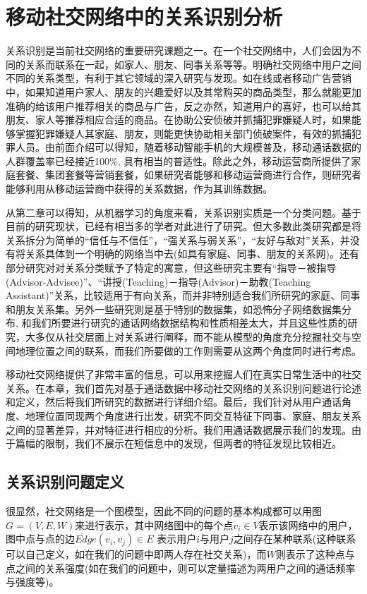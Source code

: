 \chapter{移动社交网络中的关系识别分析}

关系识别是当前社交网络的重要研究课题之一。在一个社交网络中，人们会因为不同的关系而联系在一起，如家人、朋友、同事关系等等。明确社交网络中用户之间不同的关系类型，有利于其它领域的深入研究与发现。如在线或者移动广告营销中，如果知道用户家人、朋友的兴趣爱好以及其常购买的商品类型，那么就能更加准确的给该用户推荐相关的商品与广告，反之亦然，知道用户的喜好，也可以给其朋友、家人等推荐相应合适的商品。在协助公安侦破并抓捕犯罪嫌疑人时，如果能够掌握犯罪嫌疑人其家庭、朋友，则能更快协助相关部门侦破案件，有效的抓捕犯罪人员。由前面介绍可以得知，随着移动智能手机的大规模普及，移动通话数据的人群覆盖率已经接近100\%, 具有相当的普适性。除此之外，移动运营商所提供了家庭套餐、集团套餐等营销套餐，如果研究者能够和移动运营商进行合作，则研究者能够利用从移动运营商中获得的关系数据，作为其训练数据。

从第二章可以得知，从机器学习的角度来看，关系识别实质是一个分类问题。基于目前的研究现状，已经有相当多的学者对此进行了研究。但大多数此类研究都是将关系拆分为简单的“信任与不信任”，“强关系与弱关系”，“友好与敌对”关系，并没有将关系具体到一个明确的网络当中去(如具有家庭、同事、朋友的关系网)。还有部分研究对对关系分类赋予了特定的寓意，但这些研究主要有“指导－被指导(Advisor-Advisee)”、“讲授(Teaching)－指导(Advisor)－助教(Teaching Assistant)”关系，比较适用于有向关系，而并非特别适合我们所研究的家庭、同事和朋友关系集。另外一些研究则是基于特别的数据集，如恐怖分子网络数据集分布, 和我们所要进行研究的通话网络数据结构和性质相差太大，并且这些性质的研究，大多仅从社交层面上对关系进行阐释，而不能从模型的角度充分挖掘社交与空间地理位置之间的联系，而我们所要做的工作则需要从这两个角度同时进行考虑。


移动社交网络提供了非常丰富的信息，可以用来挖掘人们在真实日常生活中的社交关系。在本章，我们首先对基于通话数据中移动社交网络的关系识别问题进行论述和定义，然后将我们所研究的数据进行详细介绍。最后，我们针对从用户通话角度、地理位置同现两个角度进行出发，研究不同交互特征下同事、家庭、朋友关系之间的显著差异，并对特征进行相应的分析。我们用通话数据展示我们的发现。由于篇幅的限制，我们不展示在短信息中的发现，但两者的特征发现比较相近。

\section{关系识别问题定义}
很显然，社交网络是一个图模型，因此不同的问题的基本构成都可以用图$G = (V, E, W)$来进行表示，其中网络图中的每个点$ v_i \in V$表示该网络中的用户，图中点与点的边$Edge(v_i, v_j) \in E$ 表示用户$i$与用户$j$之间存在某种联系(这种联系可以自己定义，如在我们的问题中即两人存在社交关系)，而$W$则表示了这种点与点之间的关系强度(如在我们的问题中，则可以定量描述为两用户之间的通话频率与强度等)。

